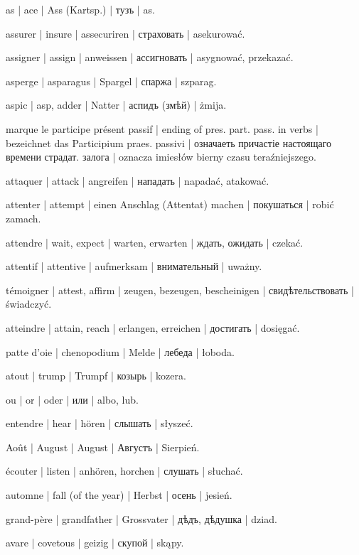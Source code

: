 \begin{outdent}{1em}
as | ace | Ass (Kartsp.) | тузъ | as.

assurer | insure | assecuriren | страховать | asekurować.

assigner | assign | anweissen | ассигновать | asygnować,
przekazać.

asperge | asparagus | Spargel | спаржа | szparag.

aspic | asp, adder | Natter | аспидъ (змѣй) | żmija.

marque le participe présent passif | ending of
pres. part. pass. in verbs | bezeichnet das Participium praes. passivi | означаеть причастіе настоящаго времени страдат. залога | oznacza
imiesłów bierny czasu teraźniejszego.

attaquer | attack | angreifen | нападать | napadać, atakować.

attenter | attempt | einen Anschlag (Attentat) machen | покушаться | robić zamach.

attendre | wait, expect | warten, erwarten | ждать, ожидать | czekać.

attentif | attentive | aufmerksam | внимательный | uważny.

témoigner | attest, affirm | zeugen, bezeugen, bescheinigen | свидѣтельствовать | świadczyć.

atteindre | attain, reach | erlangen, erreichen | достигать | dosięgać.

patte d’oie | chenopodium | Melde | лебеда | łoboda.

atout | trump | Trumpf | козырь | kozera.

ou | or | oder | или | albo, lub.

entendre | hear | hören | слышать | słyszeć.

Août | August | August | Августъ | Sierpień.

écouter | listen | anhören, horchen | слушать | słuchać.

automne | fall (of the year) | Herbst | осень | jesień.

grand-père | grandfather | Grossvater | дѣдъ, дѣдушка | dziad.

avare | covetous | geizig | скупой | skąpy.


\end{outdent}
